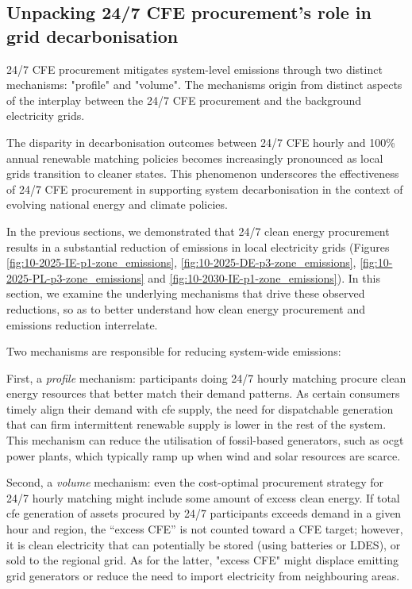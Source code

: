 \subsection{Unpacking 24/7 CFE procurement's role in grid decarbonisation}
\label{subsec:mechanisms}

\begin{res}
    24/7 CFE procurement mitigates system-level \co \newline 
    emissions through two distinct mechanisms: "profile" and "volume". The mechanisms origin from distinct aspects of the interplay between the 24/7 CFE procurement and the background electricity grids.
\end{res}

\begin{res}
    The disparity in decarbonisation outcomes between 24/7 CFE hourly and 100\% annual renewable matching policies becomes increasingly pronounced as local grids transition to cleaner states. This phenomenon underscores the effectiveness of 24/7 CFE procurement in supporting system decarbonisation in the context of evolving national energy and climate policies.
\end{res}

In the previous sections, we demonstrated that 24/7 clean energy procurement results in a substantial reduction of \co emissions in local electricity grids (Figures \ref{fig:10-2025-IE-p1-zone_emissions}, \ref{fig:10-2025-DE-p3-zone_emissions}, \ref{fig:10-2025-PL-p3-zone_emissions} and \ref{fig:10-2030-IE-p1-zone_emissions}).
In this section, we examine the underlying mechanisms that drive these observed reductions, so as to better understand how clean energy procurement and emissions reduction interrelate.

Two mechanisms are responsible for reducing system-wide emissions:

First, a \textit{profile} mechanism: participants doing 24/7 hourly matching procure clean energy resources that better match their demand patterns. 
As certain consumers timely align their demand with \gls{cfe} supply, the need for dispatchable generation that can firm intermittent renewable supply is lower in the rest of the system. 
This mechanism can reduce the utilisation of fossil-based generators, such as \gls{ocgt} power plants, which typically ramp up when wind and solar resources are scarce.

Second, a \textit{volume} mechanism: even the cost-optimal procurement strategy for 24/7 hourly matching might include some amount of excess clean energy.
If total \gls{cfe} generation of assets procured by 24/7 participants exceeds demand in a given hour and region, the “excess CFE” is not counted toward a CFE target; however, it is clean electricity that can potentially be stored (using batteries or LDES), or sold to the regional grid.
As for the latter, "excess CFE" might displace emitting grid generators or reduce the need to import electricity from neighbouring areas.

